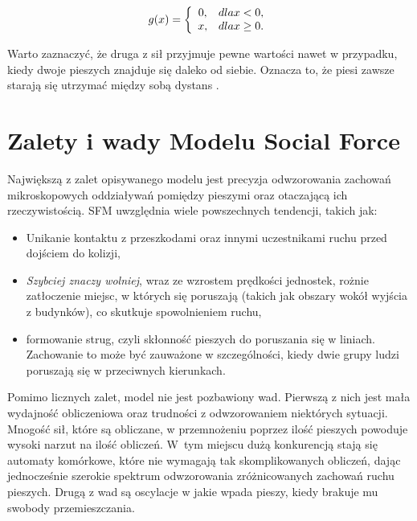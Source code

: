 \begin{equation}
g(x) = \left\{ 
\begin{array}{c l}	
     0, & dla x < 0,\\
     x, & dla x \geq 0.
\end{array}\right.
\end{equation}

Warto zaznaczyć, że druga z sił przyjmuje pewne wartości nawet w przypadku, kiedy dwoje pieszych znajduje się daleko od siebie. Oznacza to, że piesi zawsze starają się utrzymać między sobą dystans \cite{relativeVelocity}.


\section{Zalety i wady Modelu Social Force}

Największą z zalet opisywanego modelu jest precyzja odwzorowania zachowań mikroskopowych oddziaływań pomiędzy pieszymi oraz otaczającą ich rzeczywistością. SFM uwzględnia wiele powszechnych tendencji, takich jak:

\begin{itemize}
\item Unikanie kontaktu z przeszkodami oraz innymi uczestnikami ruchu przed dojściem do kolizji,
\item \textit{Szybciej znaczy wolniej}, wraz ze wzrostem prędkości jednostek, rożnie zatłoczenie miejsc, w których się poruszają (takich jak obszary wokół wyjścia z budynków), co skutkuje spowolnieniem ruchu,
\item formowanie strug, czyli skłonność pieszych do poruszania się w liniach. Zachowanie to może być zauważone w szczególności, kiedy dwie grupy ludzi poruszają się w przeciwnych kierunkach.
\end{itemize}
Pomimo licznych zalet, model nie jest pozbawiony wad. Pierwszą z nich jest mała wydajność obliczeniowa oraz trudności z odwzorowaniem niektórych sytuacji. Mnogość sił, które są obliczane, w przemnożeniu poprzez ilość pieszych powoduje wysoki narzut na ilość obliczeń. W~tym miejscu dużą konkurencją stają się automaty komórkowe, które nie wymagają tak skomplikowanych obliczeń, dając jednocześnie szerokie spektrum odwzorowania zróżnicowanych zachowań ruchu pieszych. Drugą z wad są oscylacje w jakie wpada pieszy, kiedy brakuje mu swobody przemieszczania.
